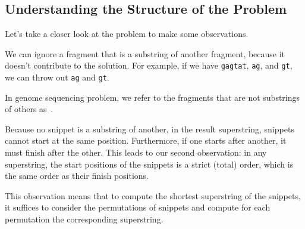 \subsection{Understanding the Structure of the Problem}
\label{sec:genome::prob::understanding}

\begin{cluster}
\label{grp:grm:genome::take}

\begin{gram}
\label{grm:genome::take}
Let's take a closer look at the problem to make some observations.

\end{gram}
\end{cluster}

\begin{cluster}
\label{grp:grm:genome::observation-1}

\begin{gram}[Observation 1]
\label{grm:genome::observation-1}
We can ignore a fragment that is a substring of another fragment,
because it doesn't contribute to the solution.
For example, if we have \texttt{gagtat}, \texttt{ag}, and \texttt{gt},
we can throw out \texttt{ag} and \texttt{gt}. 

\end{gram}
\end{cluster}

\begin{cluster}
\label{grp:def:genome::snippets}

\begin{definition}[Snippets]
\label{def:genome::snippets}
In genome sequencing problem, we refer to the fragments that are not
substrings of others as~.

\end{definition}
\end{cluster}

\begin{cluster}
\label{grp:grm:genome::observation-2-ordering-of-the-snippets}

\begin{gram}
\label{grm:genome::observation-2-ordering-of-the-snippets}
Because no snippet is a substring of another, in the result
superstring, snippets cannot start at the same position.
Furthermore, if one starts after another, it must finish after the
other.  
This leads to our second observation: in any superstring, the start
positions of the snippets is a strict (total) order, which is the same
order as their finish positions.

This observation means that to compute the shortest superstring of the
snippets, it suffices to consider the permutations of snippets and
compute for each permutation the corresponding superstring.

\end{gram}
\end{cluster}

